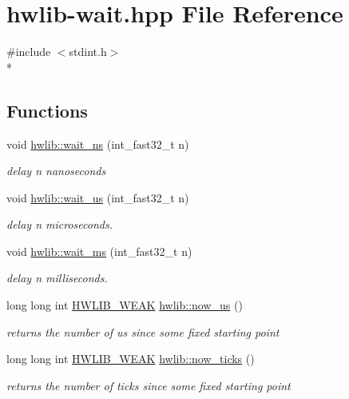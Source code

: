 \hypertarget{hwlib-wait_8hpp}{}\section{hwlib-\/wait.hpp File Reference}
\label{hwlib-wait_8hpp}
{\ttfamily \#include $<$stdint.\+h$>$}\\*
\subsection*{Functions}
\begin{DoxyCompactItemize}
\item 
void \hyperlink{hwlib-due_8hpp_a9c01a1d0319f5eadd8926e66aea19aa0}{hwlib\+::wait\+\_\+ns} (int\+\_\+fast32\+\_\+t n)
\begin{DoxyCompactList}\small\item\em delay n nanoseconds \end{DoxyCompactList}\item 
void \hyperlink{hwlib-due_8hpp_a0096b739fc566c896366ecbd3113cc1e}{hwlib\+::wait\+\_\+us} (int\+\_\+fast32\+\_\+t n)
\begin{DoxyCompactList}\small\item\em delay n microseconds. \end{DoxyCompactList}\item 
void \hyperlink{hwlib-due_8hpp_a6119aa5d3034176aa1515ef4bb193044}{hwlib\+::wait\+\_\+ms} (int\+\_\+fast32\+\_\+t n)
\begin{DoxyCompactList}\small\item\em delay n milliseconds. \end{DoxyCompactList}\item 
long long int \hyperlink{hwlib-defines_8hpp_a04be4340016df60d6636c1d1c6d94fc9}{H\+W\+L\+I\+B\+\_\+\+W\+E\+AK} \hyperlink{hwlib-due_8hpp_aa96fdf113860b88c1d99f4152c7bf28f}{hwlib\+::now\+\_\+us} ()
\begin{DoxyCompactList}\small\item\em returns the number of us since some fixed starting point \end{DoxyCompactList}\item 
long long int \hyperlink{hwlib-defines_8hpp_a04be4340016df60d6636c1d1c6d94fc9}{H\+W\+L\+I\+B\+\_\+\+W\+E\+AK} \hyperlink{hwlib-due_8hpp_a67d9fb94cfe33623b7cdb37620b2e3ae}{hwlib\+::now\+\_\+ticks} ()\hypertarget{hwlib-due_8hpp_a67d9fb94cfe33623b7cdb37620b2e3ae}{}\label{hwlib-due_8hpp_a67d9fb94cfe33623b7cdb37620b2e3ae}

\begin{DoxyCompactList}\small\item\em returns the number of ticks since some fixed starting point \end{DoxyCompactList}\end{DoxyCompactItemize}


